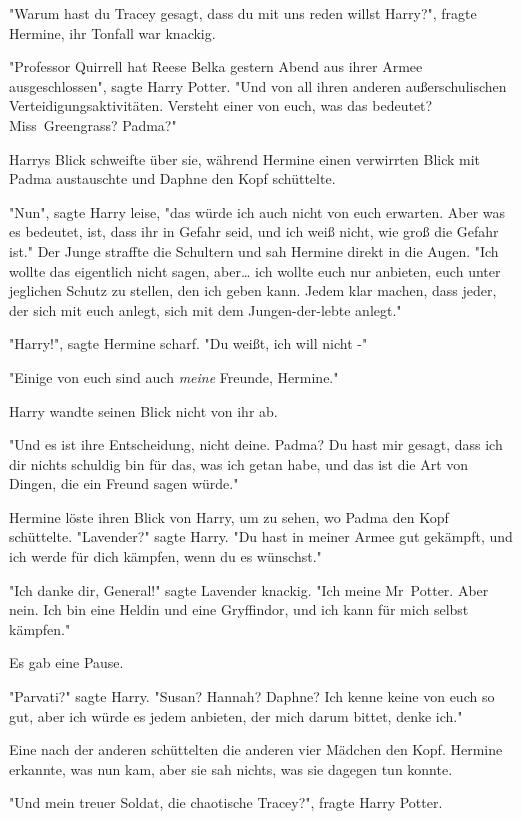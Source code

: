 {"Warum hast du Tracey gesagt, dass du mit uns reden willst Harry?", fragte Hermine, ihr Tonfall war knackig.

"Professor Quirrell hat Reese Belka gestern Abend aus ihrer Armee ausgeschlossen", sagte Harry Potter. "Und von all ihren anderen außerschulischen Verteidigungsaktivitäten. Versteht einer von euch, was das bedeutet? Miss~Greengrass? Padma?"

Harrys Blick schweifte über sie, während Hermine einen verwirrten Blick mit Padma austauschte und Daphne den Kopf schüttelte.

"Nun", sagte Harry leise, "das würde ich auch nicht von euch erwarten. Aber was es bedeutet, ist, dass ihr in Gefahr seid, und ich weiß nicht, wie groß die Gefahr ist." Der Junge straffte die Schultern und sah Hermine direkt in die Augen. "Ich wollte das eigentlich nicht sagen, aber… ich wollte euch nur anbieten, euch unter jeglichen Schutz zu stellen, den ich geben kann. Jedem klar machen, dass jeder, der sich mit euch anlegt, sich mit dem Jungen-der-lebte anlegt."

"Harry!", sagte Hermine scharf. "Du weißt, ich will nicht -"

"Einige von euch sind auch \emph{meine} Freunde, Hermine."

Harry wandte seinen Blick nicht von ihr ab.

"Und es ist ihre Entscheidung, nicht deine. Padma? Du hast mir gesagt, dass ich dir nichts schuldig bin für das, was ich getan habe, und das ist die Art von Dingen, die ein Freund sagen würde."

Hermine löste ihren Blick von Harry, um zu sehen, wo Padma den Kopf schüttelte. "Lavender?" sagte Harry. "Du hast in meiner Armee gut gekämpft, und ich werde für dich kämpfen, wenn du es wünschst."

"Ich danke dir, General!" sagte Lavender knackig. "Ich meine Mr~Potter. Aber nein. Ich bin eine Heldin und eine Gryffindor, und ich kann für mich selbst kämpfen."

Es gab eine Pause.

"Parvati?" sagte Harry. "Susan? Hannah? Daphne? Ich kenne keine von euch so gut, aber ich würde es jedem anbieten, der mich darum bittet, denke ich."

Eine nach der anderen schüttelten die anderen vier Mädchen den Kopf. Hermine erkannte, was nun kam, aber sie sah nichts, was sie dagegen tun konnte.

"Und mein treuer Soldat, die chaotische Tracey?", fragte Harry Potter.

}

